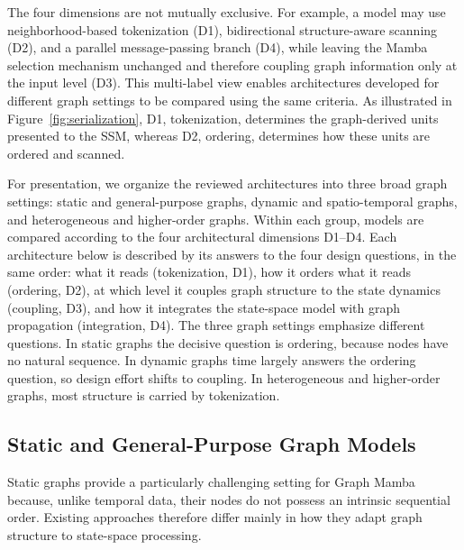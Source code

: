 \documentclass[acmsmall]{acmart}
\begin{document}
The four dimensions are not mutually exclusive. For example, a model may use neighborhood-based tokenization (D1), bidirectional structure-aware scanning (D2), and a parallel message-passing branch (D4), while leaving the Mamba selection mechanism unchanged and therefore coupling graph information only at the input level (D3). This multi-label view enables architectures developed for different graph settings to be compared using the same criteria.  %
As illustrated in Figure~\ref{fig:serialization}, D1, tokenization, determines the graph-derived
units presented to the SSM, whereas D2, ordering, determines how these units are ordered
and scanned.

For presentation, we organize the reviewed architectures into three broad
graph settings: static and general-purpose graphs, dynamic and spatio-temporal
graphs, and heterogeneous and higher-order graphs. Within each group, models are compared according to the four
architectural dimensions D1--D4.
Each architecture below is described by its answers to the four design
questions, in the same order: what it reads (tokenization, D1), how it orders
what it reads (ordering, D2), at which level it couples graph structure to the
state dynamics (coupling, D3), and how it integrates the state-space model
with graph propagation (integration, D4). The three graph settings emphasize
different questions. In static graphs the decisive question is ordering,
because nodes have no natural sequence. In dynamic graphs time largely answers
the ordering question, so design effort shifts to coupling. In heterogeneous
and higher-order graphs, most structure is carried by tokenization.


\subsection{Static and General-Purpose Graph Models}
\label{subsec:static-models}

Static graphs provide a particularly challenging setting for Graph Mamba
because, unlike temporal data, their nodes do not possess an intrinsic
sequential order. Existing approaches therefore differ mainly in how they
adapt graph structure to state-space processing. %
\end{document}
